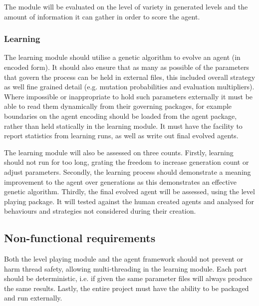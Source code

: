 The module will be evaluated on the level of variety in generated levels and the amount of information it can gather in order to score the agent.

\subsubsection{Learning}
The learning module should utilise a genetic algorithm to evolve an agent (in encoded form). It should also ensure that as many as possible of the parameters that govern the process can be held in external files, this included overall strategy as well fine grained detail (e.g. mutation probabilities and evaluation multipliers). Where impossible or inappropriate to hold such parameters externally it must be able to read them dynamically from their governing packages, for example boundaries on the agent encoding should be loaded from the agent package, rather than held statically in the learning module. It must have the facility to report statistics from learning runs, as well as write out final evolved agents.

The learning module will also be assessed on three counts. Firstly, learning should not run for too long, grating the freedom to increase generation count or adjust parameters. Secondly, the learning process should demonstrate a meaning improvement to the agent over generations as this demonstrates an effective genetic algorithm. Thirdly, the final evolved agent will be assessed, using the level playing package. It will tested against the human created agents and analysed for behaviours and strategies not considered during their creation. 



\subsection{Non-functional requirements}

Both the level playing module and the agent framework should not prevent or harm thread safety, allowing multi-threading in the learning module. Each part should be deterministic, i.e. if given the same parameter files will always produce the same results. Lastly, the entire project must have the ability to be packaged and run externally.



